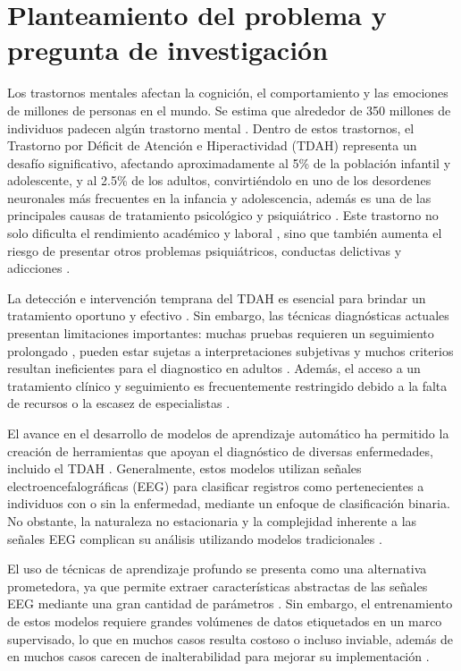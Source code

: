 
\section{Planteamiento del problema y pregunta de investigación}

Los trastornos mentales afectan la cognición, el comportamiento y las emociones de millones de personas en el mundo. Se estima que alrededor de 350 millones de individuos padecen algún trastorno mental \cite{Dehghan-Bonari2023}. Dentro de estos trastornos, el Trastorno por Déficit de Atención e Hiperactividad (TDAH) representa un desafío significativo, afectando aproximadamente al 5\% de la población infantil y adolescente, y al 2.5\% de los adultos, convirtiéndolo en uno de los desordenes neuronales más frecuentes en la infancia y adolescencia, además es una de las principales causas de tratamiento psicológico y psiquiátrico \cite{Salari2023}. Este trastorno no solo dificulta el rendimiento académico y laboral \cite{Ayano2020}, sino que también aumenta el riesgo de presentar otros problemas psiquiátricos, conductas delictivas y adicciones \cite{Faraone2015}.

La detección e intervención temprana del TDAH es esencial para brindar un tratamiento oportuno y efectivo \cite{Kivumbi2019}. Sin embargo, las técnicas diagnósticas actuales presentan limitaciones importantes: muchas pruebas requieren un seguimiento prolongado \cite{Zhou2015-bg}, pueden estar sujetas a interpretaciones subjetivas \cite{LOHANI2023111689} y muchos criterios resultan ineficientes para el diagnostico en adultos \cite{Sibley21042021}. Además, el acceso a un tratamiento clínico y seguimiento es frecuentemente restringido debido a la falta de recursos o la escasez de especialistas \cite{Asherson2022,Pallanti2020}.

El avance en el desarrollo de modelos de aprendizaje automático ha permitido la creación de herramientas que apoyan el diagnóstico de diversas enfermedades, incluido el TDAH \cite{article}. Generalmente, estos modelos utilizan señales electroencefalográficas (EEG) para clasificar registros como pertenecientes a individuos con o sin la enfermedad, mediante un enfoque de clasificación binaria. No obstante, la naturaleza no estacionaria y la complejidad inherente a las señales EEG complican su análisis utilizando modelos tradicionales \cite{KHARE2023106676,Loh2024}.

El uso de técnicas de aprendizaje profundo se presenta como una alternativa prometedora, ya que permite extraer características abstractas de las señales EEG mediante una gran cantidad de parámetros \cite{Jahani2024,Garcia-Argibay2023,Moghaddari2020}. Sin embargo, el entrenamiento de estos modelos requiere grandes volúmenes de datos etiquetados en un marco supervisado, lo que en muchos casos resulta costoso o incluso inviable, además de en muchos casos carecen de inalterabilidad para mejorar su implementación \cite{emam2021statedatacomputervision,healthcare11030285}.

